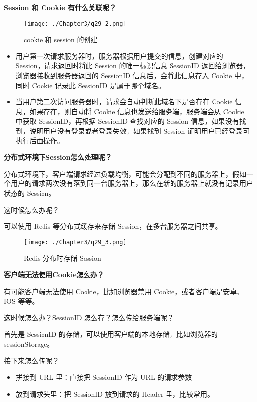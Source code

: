 \documentclass[cn,11pt,color=blue,lang=cn]{elegantbook}
\begin{document}
\begin{solution}
\begin{note} \textbf{Session 和 Cookie 有什么关联呢？} \end{note}
\begin{figure}[htbp]
\centering
\texttt{[image: ./Chapter3/q29\_2.png]}
\caption{cookie 和 session 的创建}
\label{fig29_2}
\end{figure}
\begin{itemize}
	\item 用户第一次请求服务器时，服务器根据用户提交的信息，创建对应的 Session，请求返回时将此 Session 的唯一标识信息 SessionID 返回给浏览器，浏览器接收到服务器返回的 SessionID 信息后，会将此信息存入 Cookie 中，同时 Cookie 记录此 SessionID 是属于哪个域名。
	\item 当用户第二次访问服务器时，请求会自动判断此域名下是否存在 Cookie 信息，如果存在，则自动将 Cookie 信息也发送给服务端，服务端会从 Cookie 中获取 SessionID，再根据 SessionID 查找对应的 Session 信息，如果没有找到，说明用户没有登录或者登录失效，如果找到 Session 证明用户已经登录可执行后面操作。
\end{itemize}

\begin{note} \textbf{分布式环境下Session怎么处理呢？} \end{note}

分布式环境下，客户端请求经过负载均衡，可能会分配到不同的服务器上，假如一个用户的请求两次没有落到同一台服务器上，那么在新的服务器上就没有记录用户状态的 Session。

这时候怎么办呢？

可以使用 Redis 等分布式缓存来存储 Session，在多台服务器之间共享。
\begin{figure}[htbp]
\centering
\texttt{[image: ./Chapter3/q29\_3.png]}
\caption{Redis 分布时存储 Session}
\label{fig29_3}
\end{figure}

\begin{note} \textbf{客户端无法使用Cookie怎么办？} \end{note}

有可能客户端无法使用 Cookie，比如浏览器禁用 Cookie，或者客户端是安卓、IOS 等等。

这时候怎么办？SessionID 怎么存？怎么传给服务端呢？

首先是 SessionID 的存储，可以使用客户端的本地存储，比如浏览器的 sessionStorage。

接下来怎么传呢？
\begin{itemize}
	\item 拼接到 URL 里：直接把 SessionID 作为 URL 的请求参数
	\item 放到请求头里：把 SessionID 放到请求的 Header 里，比较常用。
\end{itemize}

\end{solution}
\end{document}
